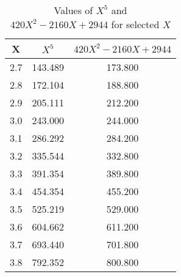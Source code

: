 ﻿%
\begin{table}[h!]
    \centering
    \caption{Values of $X^5$ and $420X^2 - 2160X + 2944$ for selected $X$}
    \begin{tabular}{|c|c|c|}
        \hline
        \textbf{X} & \textbf{$X^5$} & \textbf{$420X^2 - 2160X + 2944$} \\ \hline
        2.7        & 143.489        & 173.800                          \\ \hline
        2.8        & 172.104        & 188.800                          \\ \hline
        2.9        & 205.111        & 212.200                          \\ \hline
        3.0        & 243.000        & 244.000                          \\ \hline
        3.1        & 286.292        & 284.200                          \\ \hline
        3.2        & 335.544        & 332.800                          \\ \hline
        3.3        & 391.354        & 389.800                          \\ \hline
        3.4        & 454.354        & 455.200                          \\ \hline
        3.5        & 525.219        & 529.000                          \\ \hline
        3.6        & 604.662        & 611.200                          \\ \hline
        3.7        & 693.440        & 701.800                          \\ \hline
        3.8        & 792.352        & 800.800                          \\ \hline

\end{tabular}
\end{table}
